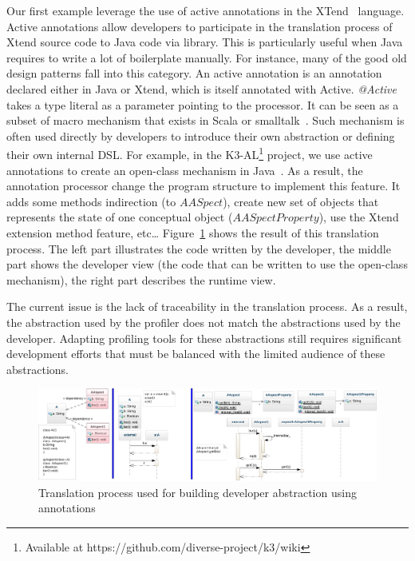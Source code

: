 Our first example leverage the use of active annotations in the XTend~\cite{bettini2013implementing} language.
Active annotations allow developers to participate in the translation process of Xtend source code to Java code via library.
This is particularly useful when Java requires to write a lot of boilerplate manually. 
For instance, many of the good old design patterns fall into this category. 
An active annotation is an annotation declared either in Java or Xtend, which is itself annotated with Active. 
\textit{@Active} takes a type literal as a parameter pointing to the processor. 
It can be seen as a subset of macro mechanism that exists in Scala or smalltalk~\cite{burmako2013scala}. 
Such mechanism is often used directly by developers to introduce their own abstraction or defining their own internal DSL. 
For example, in the K3-AL\footnote{Available at https://github.com/diverse-project/k3/wiki} project, we use active annotations to create an open-class mechanism in Java~\cite{Clifton:2000:MMO:353171.353181}. 
As a result, the annotation processor change the program structure to implement this feature. 
It adds some methods indirection (to $AASpect$), create new set of objects that represents the state of one conceptual object ($AASpectProperty$), use the Xtend extension method feature, etc\dots 
Figure~\ref{fig:famous} shows the result of this translation process. 
The left part illustrates the code written by the developer, the middle part shows the developer view (the code that can be written to use the open-class mechanism), the right part describes the runtime view. 
 
The current issue is the lack of traceability in the translation process. 
As a result, the abstraction used by the profiler does not match the abstractions used by the developer. 
Adapting profiling tools for these abstractions still requires significant development efforts that must be balanced with the limited audience of these abstractions.

\begin{figure}
\centering
\includegraphics[width=0.9\linewidth]{chapter6/fig/famous}
\caption{Translation process used for building developer abstraction using annotations}
\label{fig:famous}
\end{figure}

